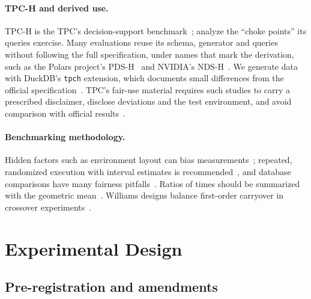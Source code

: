 \documentclass[sigconf, nonacm]{acmart}
\begin{document}
\paragraph{TPC-H and derived use.} TPC-H is the TPC's decision-support
benchmark~\citep{tpch301,poess2000tpc}; \citet{boncz2014tpch} analyze the
``choke points'' its queries exercise. Many evaluations reuse its schema,
generator and queries without following the full specification, under names
that mark the derivation, such as the Polars project's PDS-H~\citep{vink2025pdsh}
and NVIDIA's NDS-H~\citep{nvidia_spark_benchmarks}. We generate data with
DuckDB's \texttt{tpch} extension, which documents small differences from the
official specification~\citep{duckdb_tpch_ext}. TPC's fair-use material
requires such studies to carry a prescribed disclaimer, disclose deviations and
the test environment, and avoid comparison with official
results~\citep{tpcfairuse2019,tpcpolicies620}.

\paragraph{Benchmarking methodology.} Hidden factors such as environment
layout can bias measurements~\citep{mytkowicz2009wrong}; repeated, randomized
execution with interval estimates is recommended~\citep{kalibera2013rigorous,
hoefler2015scientific}, and database comparisons have many fairness
pitfalls~\citep{raasveldt2018fair}. Ratios of times should be summarized with
the geometric mean~\citep{fleming1986geomean}. Williams designs balance
first-order carryover in crossover experiments~\citep{williams1949latin}.

\section{Experimental Design}
\label{sec:design}

\subsection{Pre-registration and amendments}
\label{sec:prereg}
\end{document}
